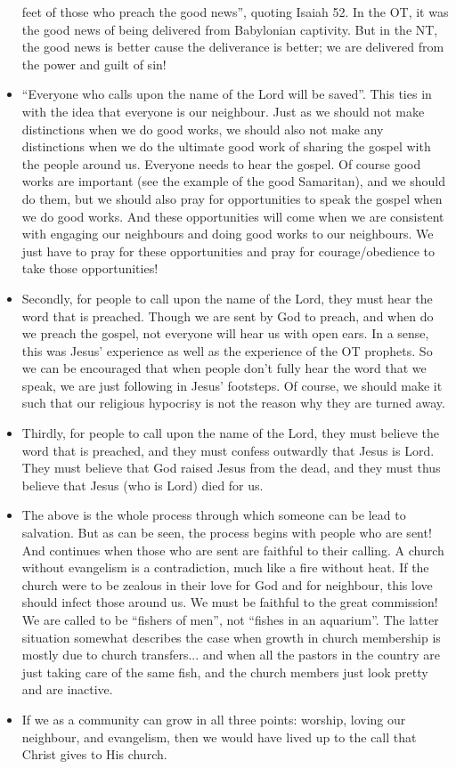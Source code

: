 \begin{itemize}
{  feet of those who preach the good news'', quoting Isaiah 52. In the OT, it
  was the good news of being delivered from Babylonian captivity. But in the
  NT, the good news is better cause the deliverance is better; we are
  delivered from the power and guilt of sin! }
  \item{``Everyone who calls upon the name of the Lord will be saved''. This
  ties in with the idea that everyone is our neighbour. Just as we should not
  make distinctions when we do good works, we should also not make any
  distinctions when we do the ultimate good work of sharing the gospel with
  the people around us. Everyone needs to hear the gospel. Of course good
  works are important (see the example of the good Samaritan), and we should
  do them, but we should also pray for opportunities to speak the gospel when
  we do good works. And these opportunities will come when we are consistent
  with engaging our neighbours and doing good works to our neighbours. We
  just have to pray for these opportunities and pray for courage/obedience to
  take those opportunities!}
  \item{Secondly, for people to call upon the name of the Lord, they must
  hear the word that is preached. Though we are sent by God to preach, and
  when do we preach the gospel, not everyone will hear us with open ears. In
  a sense, this was Jesus' experience as well as the experience of the OT
  prophets. So we can be encouraged that when people don't fully hear the
  word that we speak, we are just following in Jesus' footsteps. Of course,
  we should make it such that our religious hypocrisy is not the reason why
  they are turned away. }
  \item{Thirdly, for people to call upon the name of the Lord, they must
  believe the word that is preached, and they must confess outwardly that
  Jesus is Lord. They must believe that God raised Jesus from the dead, and
  they must thus believe that Jesus (who is Lord) died for us. }
  \item{The above is the whole process through which someone can be lead to
  salvation. But as can be seen, the process begins with people who are sent!
  And continues when those who are sent are faithful to their calling. A
  church without evangelism is a contradiction, much like a fire without
  heat. If the church were to be zealous in their love for God and for
  neighbour, this love should infect those around us. We must be faithful to
  the great commission! We are called to be ``fishers of men'', not ``fishes
  in an aquarium''. The latter situation somewhat describes the case when
  growth in church membership is mostly due to church transfers... and when
  all the pastors in the country are just taking care of the same fish, and
  the church members just look pretty and are inactive.}
  \item{If we as a community can grow in all three points: worship, loving
  our neighbour, and evangelism, then we would have lived up to the call that
  Christ gives to His church.}
\end{itemize}













